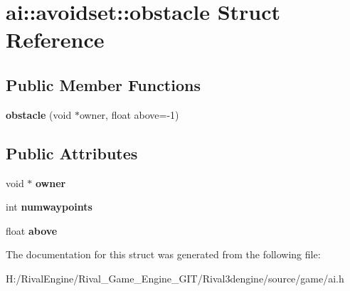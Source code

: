 \hypertarget{structai_1_1avoidset_1_1obstacle}{}\section{ai\+:\+:avoidset\+:\+:obstacle Struct Reference}
\label{structai_1_1avoidset_1_1obstacle}
\subsection*{Public Member Functions}
\begin{DoxyCompactItemize}
\item 
\mbox{\label{structai_1_1avoidset_1_1obstacle_ad67f6ea4a703190874a19fc591830b95}} 
{\bfseries obstacle} (void $\ast$owner, float above=-\/1)
\end{DoxyCompactItemize}
\subsection*{Public Attributes}
\begin{DoxyCompactItemize}
\item 
\mbox{\label{structai_1_1avoidset_1_1obstacle_ad0bd0eb043001d9b32b70be29864f5f8}} 
void $\ast$ {\bfseries owner}
\item 
\mbox{\label{structai_1_1avoidset_1_1obstacle_ab17057993b03e719e43932140053cb76}} 
int {\bfseries numwaypoints}
\item 
\mbox{\label{structai_1_1avoidset_1_1obstacle_a4d818ed536523846ca1bda3d5c64d7a3}} 
float {\bfseries above}
\end{DoxyCompactItemize}


The documentation for this struct was generated from the following file\+:\begin{DoxyCompactItemize}
\item 
H\+:/\+Rival\+Engine/\+Rival\+\_\+\+Game\+\_\+\+Engine\+\_\+\+G\+I\+T/\+Rival3dengine/source/game/ai.\+h\end{DoxyCompactItemize}
